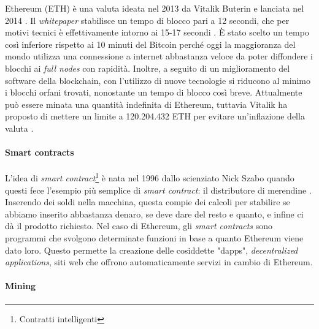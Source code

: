 \documentclass {article}
\begin{document}
Ethereum (ETH) è una valuta ideata nel 2013 da Vitalik Buterin e lanciata nel 2014 \cite{ethorigins}.
Il \textit{whitepaper} stabilisce un tempo di blocco pari a 12 secondi, che per motivi tecnici è effettivamente intorno ai 15-17 secondi \cite{ethblock1}\cite{ethblock2}.
È stato scelto un tempo così inferiore rispetto ai 10 minuti del Bitcoin perché oggi la maggioranza del mondo utilizza una connessione a internet abbastanza veloce da poter diffondere i blocchi ai \textit{full nodes} con rapidità.
Inoltre, a seguito di un miglioramento del software della blockchain, con l'utilizzo di nuove tecnologie si riducono al minimo i blocchi orfani trovati, nonostante un tempo di blocco così breve.
Attualmente può essere minata una quantità indefinita di Ethereum, tuttavia Vitalik ha proposto di mettere un limite a 120.204.432 ETH per evitare un'inflazione della valuta \cite{ethmax}.

\paragraph {Smart contracts}

L'idea di \textit{smart contract}\footnote{Contratti intelligenti} è nata nel 1996 dallo scienziato Nick Szabo quando questi fece l'esempio più semplice di \textit{smart contract}: il distributore di merendine \cite{nickszabo}.
Inserendo dei soldi nella macchina, questa compie dei calcoli per stabilire se abbiamo inserito abbastanza denaro, se deve dare del resto e quanto, e infine ci dà il prodotto richiesto.
Nel caso di Ethereum, gli \textit{smart contracts} sono programmi che svolgono determinate funzioni in base a quanto Ethereum viene dato loro.
Questo permette la creazione delle cosiddette "dapps", \textit{decentralized applications}, siti web che offrono automaticamente servizi in cambio di Ethereum.

\paragraph {Mining}
\end{document}
